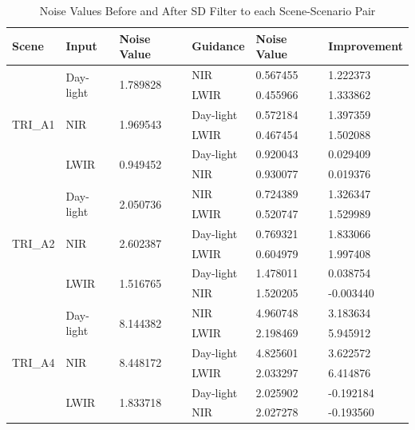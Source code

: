 \documentclass[10pt,twocolumn,letterpaper]{article}
\begin{document}
	\bgroup
	\def\arraystretch{1.25}\setlength{\tabcolsep}{1.7em}
	\begin{table}[]
		\centering
				\caption{Noise Values Before and After SD Filter to each Scene-Scenario Pair}
		\label{tableNoiseLevelImprovements}
		\begin{tabular}{llllll}
			\hline
			Scene                    & Input                      & Noise Value               & Guidance  & Noise Value & Improvement \\ \hline
			\multirow{6}{*}{TRI\_A1} & \multirow{2}{*}{Day-light} & \multirow{2}{*}{1.789828} & NIR       & 0.567455 & 1.222373    \\
			&                            &                           & LWIR      & 0.455966 & 1.333862    \\ \cline{2-6} 
			& \multirow{2}{*}{NIR}       & \multirow{2}{*}{1.969543} & Day-light & 0.572184 & 1.397359    \\
			&                            &                           & LWIR      & 0.467454 & 1.502088    \\ \cline{2-6} 
			& \multirow{2}{*}{LWIR}      & \multirow{2}{*}{0.949452} & Day-light & 0.920043 & 0.029409    \\
			&                            &                           & NIR       & 0.930077 & 0.019376    \\ \hline
			\multirow{6}{*}{TRI\_A2} & \multirow{2}{*}{Day-light} & \multirow{2}{*}{2.050736} & NIR       & 0.724389 & 1.326347    \\
			&                            &                           & LWIR      & 0.520747 & 1.529989    \\ \cline{2-6} 
			& \multirow{2}{*}{NIR}       & \multirow{2}{*}{2.602387} & Day-light & 0.769321 & 1.833066    \\
			&                            &                           & LWIR      & 0.604979 & 1.997408    \\ \cline{2-6} 
			& \multirow{2}{*}{LWIR}      & \multirow{2}{*}{1.516765} & Day-light & 1.478011 & 0.038754    \\
			&                            &                           & NIR       & 1.520205 & -0.003440   \\ \hline
			\multirow{6}{*}{TRI\_A4} & \multirow{2}{*}{Day-light} & \multirow{2}{*}{8.144382} & NIR       & 4.960748 & 3.183634    \\
			&                            &                           & LWIR      & 2.198469 & 5.945912    \\ \cline{2-6} 
			& \multirow{2}{*}{NIR}       & \multirow{2}{*}{8.448172} & Day-light & 4.825601 & 3.622572    \\
			&                            &                           & LWIR      & 2.033297 & 6.414876    \\ \cline{2-6} 
			& \multirow{2}{*}{LWIR}      & \multirow{2}{*}{1.833718} & Day-light & 2.025902 & -0.192184   \\
			&                            &                           & NIR       & 2.027278 & -0.193560   \\ \hline
		\end{tabular}

	\end{table}
	\egroup
	
	{\small
		
		
	}
	
\end{document}
